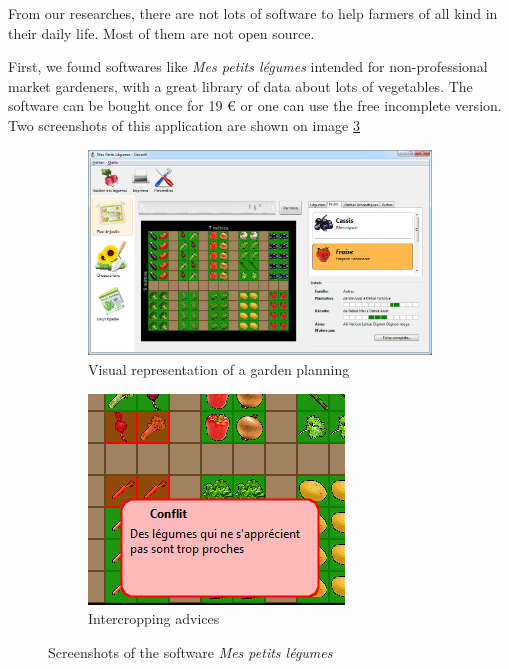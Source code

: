 From our researches, there are not lots of software to help farmers of all kind in their daily life. Most of them are not open source.

First, we found softwares like \emph{Mes petits légumes}\cite{mespetitslegumes} intended for non-professional market gardeners, with a great library of data about lots of vegetables. The software can be bought once for 19 \euro{} or one can use the free incomplete version. Two screenshots of this application are shown on image \ref{fig:mespetitslegumes}

\begin{figure}
\centering
\begin{subfigure}{.5\textwidth}
  \centering
  \includegraphics[width=0.9\linewidth]{images/petitslegumes1.jpg}
  \caption{Visual representation of a garden planning}
  \label{fig:petitslegumes1}
\end{subfigure}%
\begin{subfigure}{.5\textwidth}
  \centering
  \includegraphics[width=0.7\linewidth]{images/petitslegumes2.jpg}
  \caption{Intercropping advices}
  \label{fig:petitslegumes2}
\end{subfigure}
\caption{Screenshots of the software \emph{Mes petits légumes}}
\label{fig:mespetitslegumes}
\end{figure}




